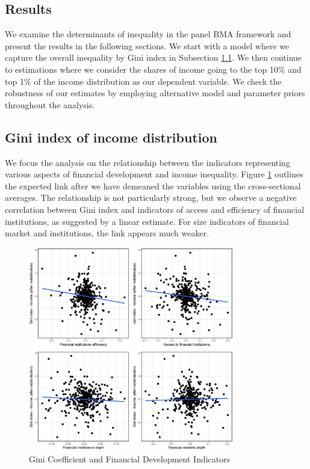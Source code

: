 \begin{refsection}
\section{Results}
\label{ch4sec:results}
We examine the determinants of inequality in the panel \ac{BMA} framework and present the results in the following sections. We start with a model where we capture the overall inequality by Gini index in Subsection \ref{ch4subsec:gini}. We then continue to estimations where we consider the shares of income going to the top 10\% and top 1\% of the income distribution as our dependent variable. We check the robustness of our estimates by employing alternative model and parameter priors throughout the analysis.

\subsection{Gini index of income distribution}\label{ch4subsec:gini}
We focus the analysis on the relationship between the indicators representing various aspects of financial development and income inequality. Figure \ref{ch4fig:gini_findev_dm} outlines the expected link after we have demeaned the variables using the cross-sectional averages. The relationship is not particularly strong, but we observe a negative correlation between Gini index and indicators of access and efficiency of financial institutions, as suggested by a linear estimate. For size indicators of financial market and institutions, the link appears much weaker.

\begin{figure}[ht!]
  \caption{Gini Coefficient and Financial Development Indicators}
  \label{ch4fig:gini_findev_dm}
  \centering
  \includegraphics[width=0.8\textwidth, keepaspectratio]{figures/ch4/plots_findev_gini_dm}
\end{figure}


\end{refsection}
